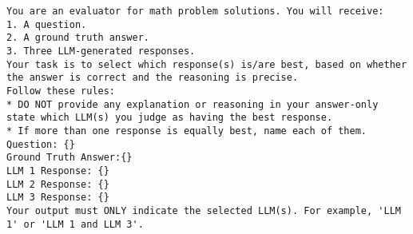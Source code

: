 \begin{adjustwidth}{1cm}{1cm}
\begin{lstlisting}[breakatwhitespace=true, showstringspaces=false, basicstyle=\ttfamily, columns=fullflexible, breaklines=true]
You are an evaluator for math problem solutions. You will receive:
1. A question.
2. A ground truth answer.
3. Three LLM-generated responses.
Your task is to select which response(s) is/are best, based on whether the answer is correct and the reasoning is precise.
Follow these rules: 
* DO NOT provide any explanation or reasoning in your answer-only state which LLM(s) you judge as having the best response.
* If more than one response is equally best, name each of them.
Question: {}
Ground Truth Answer:{}
LLM 1 Response: {}
LLM 2 Response: {}
LLM 3 Response: {}
Your output must ONLY indicate the selected LLM(s). For example, 'LLM 1' or 'LLM 1 and LLM 3'.
\end{lstlisting}
\end{adjustwidth}




